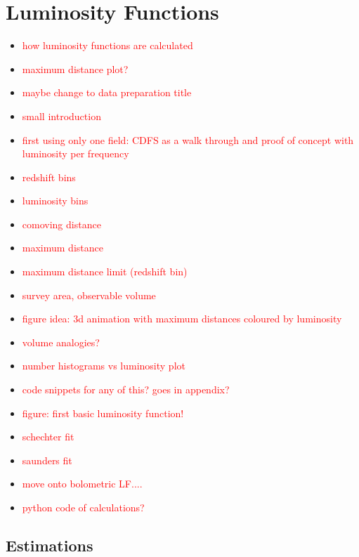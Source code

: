 \chapter{Luminosity Functions} \label{Sec: Luminosity Functions Chapter}
\thispagestyle{empty}

\begin{itemize}
    \item \textcolor{red}{how luminosity functions are calculated}
    \item \textcolor{red}{maximum distance plot?}
\end{itemize}

\begin{itemize}
    \item \textcolor{red}{maybe change to data preparation title}
    \item \textcolor{red}{small introduction}
    \item \textcolor{red}{first using only one field: CDFS as a walk through and proof of concept with luminosity per frequency}
    \item \textcolor{red}{redshift bins}
    \item \textcolor{red}{luminosity bins}
    \item \textcolor{red}{comoving distance}
    \item \textcolor{red}{maximum distance}
    \item \textcolor{red}{maximum distance limit (redshift bin)}
    \item \textcolor{red}{survey area, observable volume}
    \item \textcolor{red}{figure idea: 3d animation with maximum distances coloured by luminosity}
    \item \textcolor{red}{volume analogies?}
    \item \textcolor{red}{number histograms vs luminosity plot}
    \item \textcolor{red}{code snippets for any of this? goes in appendix?}
    \item \textcolor{red}{figure: first basic luminosity function!}
    \item \textcolor{red}{schechter fit}
    \item \textcolor{red}{saunders fit}
    \item \textcolor{red}{move onto bolometric LF....}
    \item \textcolor{red}{python code of calculations?}
\end{itemize}

\section{Estimations}

